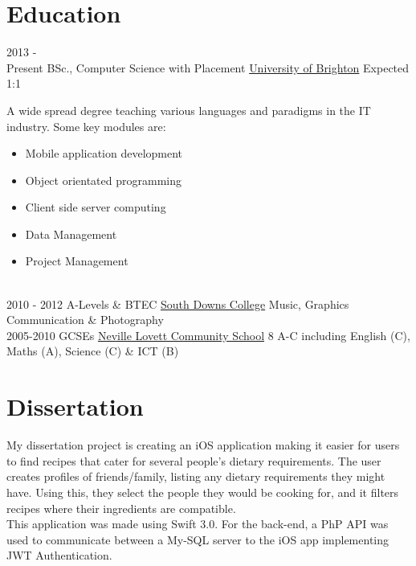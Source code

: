 \documentclass[letterpaper]{twentysecondcv} %
\begin{document}
\makeprofile %

\section{Education}

\begin{twenty} %
	\twentyitem
    	{2013 - \\Present}
       	{BSc., Computer Science with Placement}
      	{\href{https://www.brighton.ac.uk/index.aspx}{University of Brighton}}
       	{Expected 1:1}
		{A wide spread degree teaching various languages and paradigms in the IT industry. Some key modules are:
       		{\vspace{2mm}
       			\begin{itemize}
       			\setlength\itemsep{.5mm}
			        \item Mobile application development
			        \item Object orientated programming
					 \item Client side server computing
					 \item Data Management
					 \item Project Management
			    \end{itemize}
			}
        }
	\twentyitem
    	{\\2010 - 2012}
        {A-Levels \& BTEC}
        {\href{http://www.southdowns.ac.uk/}{South Downs College}}
        {}
        {Music, Graphics Communication \& Photography}
    \twentyitem
    	{\\2005-2010}
    	{GCSEs}
    	{\href{https://www.fareham-academy.hants.sch.uk/}{Neville Lovett Community School}}
    	{}
    	{8 A-C including English (C), Maths (A), Science (C) \& ICT (B)}
\end{twenty}

\vspace{-1mm}
\section{Dissertation}
\vspace{-5mm}
\begin{twenty}
	\twentyitem
		{}
		{}
		{}
		{}
		{
			My dissertation project is creating an iOS application making it easier for users to find recipes that cater for several people's dietary requirements. The user creates profiles of friends/family, listing any dietary requirements they might have. Using this, they select the people they would be cooking for, and it filters recipes where their ingredients are compatible.
			\vspace{2mm}
			\\
			This application was made using Swift 3.0. For the back-end, a PhP API was used to communicate between a My-SQL server to the iOS app implementing JWT Authentication.
		}
\end{twenty}
\end{document}
